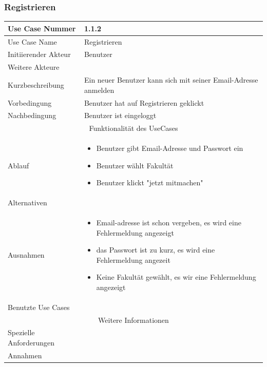 \documentclass[10pt,a4paper]{article}
\begin{document}
	\subsubsection{Registrieren}
		\begin{tabular}{|l|p{.5\linewidth}|}
		\hline Use Case Nummer & 1.1.2 \\ 
		\hline Use Case Name & Registrieren \\ 
		\hline Initiierender Akteur & Benutzer \\
		\hline Weitere Akteure &  \\
		\hline Kurzbeschreibung & Ein neuer Benutzer kann sich mit seiner Email-Adresse anmelden \\
		\hline Vorbedingung & Benutzer hat auf Registrieren geklickt \\
		\hline Nachbedingung & Benutzer ist eingeloggt \\
		\hline \multicolumn{2}{|c|}{Funktionalität des UseCases}\\
		\hline Ablauf & \begin{itemize}
			\item Benutzer gibt Email-Adresse und Passwort ein
			\item Benutzer w\"ahlt Fakult\"at
			\item Benutzer klickt "jetzt mitmachen"
		\end{itemize} \\
		\hline Alternativen &  \\
		\hline Ausnahmen & \begin{itemize}
			\item Email-adresse ist schon vergeben, es wird eine Fehlermeldung angezeigt
			\item das Passwort ist zu kurz, es wird eine Fehlermeldung angezeit
			\item Keine Fakult\"at gewählt, es wir eine Fehlermeldung angezeigt
		\end{itemize} \\
		\hline Benutzte Use Cases &  \\
		\hline \multicolumn{2}{|c|}{Weitere Informationen} \\
		\hline Spezielle Anforderungen &  \\
		\hline Annahmen &  \\
		\hline
		\end{tabular} 
		
\end{document}
